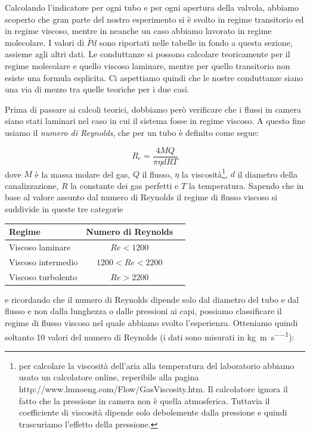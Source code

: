 Calcolando l'indicatore per ogni tubo e per ogni apertura della valvola, abbiamo scoperto che gran parte
del nostro esperimento si è svolto in regime transitorio ed in regime viscoso, mentre in neanche un caso abbiamo
lavorato in regime molecolare. I valori di $\bar{P}d$ sono riportati nelle tabelle in fondo a questa sezione,
assieme agli altri dati. Le conduttanze si possono calcolare teoricamente per il regime molecolare e quello
viscoso laminare, mentre per quello transitorio non esiste una formula esplicita. Ci aspettiamo quindi che le nostre
conduttanze siano una via di mezzo tra quelle teoriche per i due casi.

Prima di passare ai calcoli teorici, dobbiamo però verificare che i flussi in camera siano stati laminari nel
caso in cui il sistema fosse in regime viscoso.
A questo fine usiamo il \emph{numero di Reynolds}, che per un tubo è definito come segue:

\begin{equation}
    R_e = \frac{4 M Q}{\pi \eta d R T}
\end{equation}
%
dove $M$ è la massa molare del gas, $Q$ il flusso, $\eta$ la viscosità\footnote{ per calcolare la viscosità dell'aria
alla temperatura del laboratorio abbiamo usato un calcolatore online, reperibile alla pagina http://www.lmnoeng.com/Flow/GasViscosity.htm.
Il calcolatore ignora il fatto che la pressione in camera non è quella atmosferica. Tuttavia il coefficiente di viscosità
dipende solo debolemente dalla pressione e quindi trascuriamo l'effetto della pressione.},
$d$ il diametro della canalizzazione, $R$ la constante dei gas perfetti e $T$ la temperatura.
Sapendo che in base al valore assunto dal numero di Reynolds il regime di flusso viscoso si suddivide in queste tre categorie

\begin{center}
    \begin{tabular}{l c c}
        \toprule
        Regime & Numero di Reynolds \\
        \midrule
        Viscoso laminare & $Re < 1200$ \\
        Viscoso intermedio & $1200 < Re < 2200$ \\
        Viscoso turbolento & $Re > 2200$ \\
        \bottomrule
    \end{tabular}
\end{center}

e ricordando che il numero di Reynolds dipende solo dal diametro del tubo e dal flusso e non dalla lunghezza o dalle pressioni ai capi,
possiamo classificare il regime di flusso viscoso nel quale abbiamo svolto l'esperienza.
Otteniamo quindi soltanto 10 valori del numero di Reynolds (i dati sono misurati in \si{\kg\per\m\per\s}):

